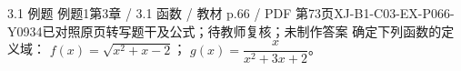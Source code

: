 \par\noindent\begin{minipage}{\linewidth}
\begin{bankitem}{3.1 例题 例题1}{第3章 / 3.1 函数 / 教材 p.66 / PDF 第73页}{XJ-B1-C03-EX-P066-Y0934}{已对照原页转写题干及公式；待教师复核；未制作答案}
确定下列函数的定义域：
$f(x)=\sqrt{x^2+x-2}$；
$g(x)=\dfrac x{x^2+3x+2}$。
\end{bankitem}
\end{minipage}\par\medskip
